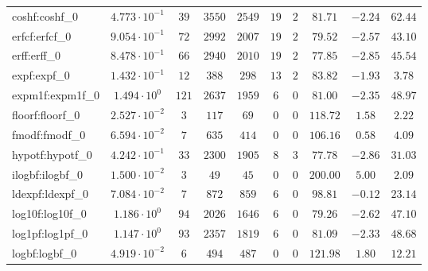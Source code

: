 \begin{tabular}{|l|c|c|c|c|c|c|c|c|c|}
coshf:coshf\_0               & $ 4.773 \cdot 10^{-1} $ & $ 39     $ & $ 3550  $ & $ 2549  $ & $ 19  $ & $ 2  $ & $ 81.71       $ & $ -2.24   $ & $ 62.44   $ \\
erfcf:erfcf\_0               & $ 9.054 \cdot 10^{-1} $ & $ 72     $ & $ 2992  $ & $ 2007  $ & $ 19  $ & $ 2  $ & $ 79.52       $ & $ -2.57   $ & $ 43.10   $ \\
erff:erff\_0                 & $ 8.478 \cdot 10^{-1} $ & $ 66     $ & $ 2940  $ & $ 2010  $ & $ 19  $ & $ 2  $ & $ 77.85       $ & $ -2.85   $ & $ 45.54   $ \\
expf:expf\_0                 & $ 1.432 \cdot 10^{-1} $ & $ 12     $ & $ 388   $ & $ 298   $ & $ 13  $ & $ 2  $ & $ 83.82       $ & $ -1.93   $ & $ 3.78    $ \\
expm1f:expm1f\_0             & $ 1.494 \cdot 10^{0}  $ & $ 121    $ & $ 2637  $ & $ 1959  $ & $ 6   $ & $ 0  $ & $ 81.00       $ & $ -2.35   $ & $ 48.97   $ \\
floorf:floorf\_0             & $ 2.527 \cdot 10^{-2} $ & $ 3      $ & $ 117   $ & $ 69    $ & $ 0   $ & $ 0  $ & $ 118.72      $ & $ 1.58    $ & $ 2.22    $ \\
fmodf:fmodf\_0               & $ 6.594 \cdot 10^{-2} $ & $ 7      $ & $ 635   $ & $ 414   $ & $ 0   $ & $ 0  $ & $ 106.16      $ & $ 0.58    $ & $ 4.09    $ \\
hypotf:hypotf\_0             & $ 4.242 \cdot 10^{-1} $ & $ 33     $ & $ 2300  $ & $ 1905  $ & $ 8   $ & $ 3  $ & $ 77.78       $ & $ -2.86   $ & $ 31.03   $ \\
ilogbf:ilogbf\_0             & $ 1.500 \cdot 10^{-2} $ & $ 3      $ & $ 49    $ & $ 45    $ & $ 0   $ & $ 0  $ & $ 200.00      $ & $ 5.00    $ & $ 2.09    $ \\
ldexpf:ldexpf\_0             & $ 7.084 \cdot 10^{-2} $ & $ 7      $ & $ 872   $ & $ 859   $ & $ 6   $ & $ 0  $ & $ 98.81       $ & $ -0.12   $ & $ 23.14   $ \\
log10f:log10f\_0             & $ 1.186 \cdot 10^{0}  $ & $ 94     $ & $ 2026  $ & $ 1646  $ & $ 6   $ & $ 0  $ & $ 79.26       $ & $ -2.62   $ & $ 47.10   $ \\
log1pf:log1pf\_0             & $ 1.147 \cdot 10^{0}  $ & $ 93     $ & $ 2357  $ & $ 1819  $ & $ 6   $ & $ 0  $ & $ 81.09       $ & $ -2.33   $ & $ 48.68   $ \\
logbf:logbf\_0               & $ 4.919 \cdot 10^{-2} $ & $ 6      $ & $ 494   $ & $ 487   $ & $ 0   $ & $ 0  $ & $ 121.98      $ & $ 1.80    $ & $ 12.21   $ \\

\end{tabular}
